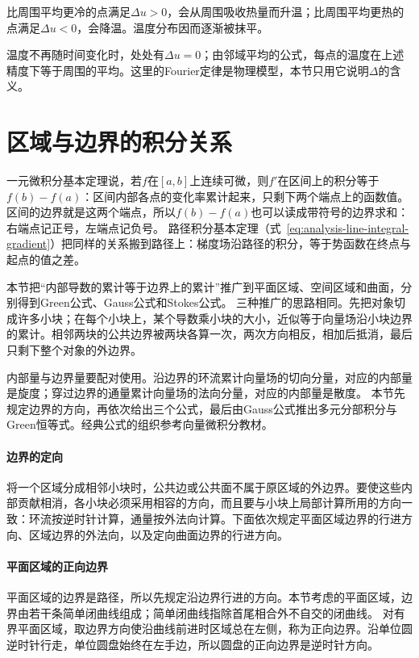 比周围平均更冷的点满足$\Delta u>0$，会从周围吸收热量而升温；比周围平均更热的点满足$\Delta u<0$，会降温。温度分布因而逐渐被抹平。

温度不再随时间变化时，处处有$\Delta u=0$；由邻域平均的公式，每点的温度在上述精度下等于周围的平均。这里的Fourier定律是物理模型，本节只用它说明$\Delta$的含义。

\section{区域与边界的积分关系}
\label{sec:multivariable-boundary-relations}

一元微积分基本定理说，若$f$在$[a,b]$上连续可微，则$f'$在区间上的积分等于$f(b)-f(a)$：区间内部各点的变化率累计起来，只剩下两个端点上的函数值。
区间的边界就是这两个端点，所以$f(b)-f(a)$也可以读成带符号的边界求和：右端点记正号，左端点记负号。
路径积分基本定理（式~\eqref{eq:analysis-line-integral-gradient}）把同样的关系搬到路径上：梯度场沿路径的积分，等于势函数在终点与起点的值之差。

本节把“内部导数的累计等于边界上的累计”推广到平面区域、空间区域和曲面，分别得到Green公式、Gauss公式和Stokes公式。
三种推广的思路相同。先把对象切成许多小块；在每个小块上，某个导数乘小块的大小，近似等于向量场沿小块边界的累计。相邻两块的公共边界被两块各算一次，两次方向相反，相加后抵消，最后只剩下整个对象的外边界。

内部量与边界量要配对使用。沿边界的环流累计向量场的切向分量，对应的内部量是旋度；穿过边界的通量累计向量场的法向分量，对应的内部量是散度。
本节先规定边界的方向，再依次给出三个公式，最后由Gauss公式推出多元分部积分与Green恒等式。经典公式的组织参考向量微积分教材。

\paragraph{边界的定向}

将一个区域分成相邻小块时，公共边或公共面不属于原区域的外边界。要使这些内部贡献相消，各小块必须采用相容的方向，而且要与小块上局部计算所用的方向一致：环流按逆时针计算，通量按外法向计算。下面依次规定平面区域边界的行进方向、区域边界的外法向，以及定向曲面边界的行进方向。

\paragraph{平面区域的正向边界}

平面区域的边界是路径，所以先规定沿边界行进的方向。本节考虑的平面区域，边界由若干条简单闭曲线组成；简单闭曲线指除首尾相合外不自交的闭曲线。
对有界平面区域，取边界方向使沿曲线前进时区域总在左侧，称为正向边界。沿单位圆逆时针行走，单位圆盘始终在左手边，所以圆盘的正向边界是逆时针方向。

